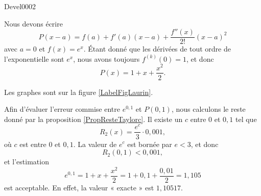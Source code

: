 
\begin{corrige}{Devel0002}


Nous devons écrire
\begin{equation}
	P(x-a)=f(a)+f'(a)(x-a)+\frac{ f''(x) }{ 2! }(x-a)^2
\end{equation}
avec $a=0$ et $f(x)= e^{x}$. Étant donné que les dérivées de tout ordre de l'exponentielle sont $e^x$, nous avons toujours $f^{(k)}(0)=1$, et donc
\begin{equation}
	P(x)=1+x+\frac{ x^2 }{ 2 }.
\end{equation}

Les graphes sont sur la figure \ref{LabelFigLaurin}.
\newcommand{\CaptionFigLaurin}{En bleu : la fonction $x\mapsto e^x$, en cyan l'approximation d'ordre \( 0\), en vert son développement d'ordre $1$ et en rouge celui d'ordre $2$.}


Afin d'évaluer l'erreur commise entre $e^{0,1}$ et $P(0,1)$, nous calculons le reste donné par la proposition \ref{PropResteTaylorc}. Il existe un $c$ entre $0$ et $0,1$ tel que
\begin{equation}
	R_2(x)=\frac{ e^c }{ 3 }\cdot 0,001,
\end{equation}
où $c$ est entre $0$ et $0,1$. La valeur de $e^c$ est bornée par $e<3$, et donc
\begin{equation}
	R_2(0,1)<0,001,
\end{equation}
et l'estimation
\begin{equation}
	e^{0,1}=1+x+\frac{ x^2 }{ 2 }=1+0,1+\frac{ 0,01 }{ 2 }=1,105
\end{equation}
est acceptable. En effet, la valeur « exacte » est $1,10517$.

\end{corrige}
